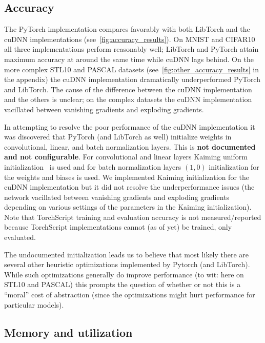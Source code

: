 \subsection{Accuracy}\label{subsec:training-and-evaluation}


The PyTorch implementation compares favorably with both LibTorch and the cuDNN implementations (see~\cref{fig:accuracy_results}).
On MNIST and CIFAR10 all three implementations perform reasonably well;
LibTorch and PyTorch attain maximum accuracy at around the same time while cuDNN lags behind.
On the more complex STL10 and PASCAL datasets (see~\cref{fig:other_accuracy_results} in the appendix) the cuDNN implementation dramatically underperformed PyTorch and LibTorch.
The cause of the difference between the cuDNN implementation and the others is unclear;
on the complex datasets the cuDNN implementation vacillated between vanishing gradients and exploding gradients.

In attempting to resolve the poor performance of the cuDNN implementation it was discovered that PyTorch (and LibTorch as well) initialize weights in convolutional, linear, and batch normalization layers.
This is \textbf{not documented and not configurable}.
For convolutional and linear layers Kaiming uniform initialization~\cite{he2015delving} is used and for batch normalization layers $(1,0)$ initialization for the weights and biases is used.
We implemented Kaiming initialization for the cuDNN implementation but it did not resolve the underperformance issues (the network vacillated between vanishing gradients and exploding gradients depending on various settings of the parameters in the Kaiming initialization).
Note that TorchScript training and evaluation accuracy is not measured/reported because TorchScript implementations cannot (as of yet) be trained, only evaluated.

The undocumented initialization leads us to believe that most likely there are several other heuristic optimizations implemented by Pytorch (and LibTorch).
While such optimizations generally do improve performance (to wit: here on STL10 and PASCAL) this prompts the question of whether or not this is a ``moral'' cost of abstraction (since the optimizations might hurt performance for particular models).

\subsection{Memory and utilization}\label{subsec:memory-and-utilization}


